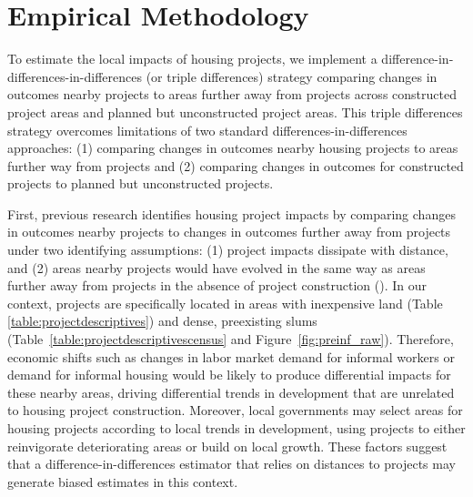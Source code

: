 \documentclass[12pt]{article}
\begin{document}
\section{Empirical Methodology}\label{section:methodology}


To estimate the local impacts of housing projects, we implement a difference-in-differences-in-differences (or triple differences) strategy comparing changes in outcomes nearby projects to areas further away from projects across constructed project areas and planned but unconstructed project areas.  This triple differences strategy overcomes limitations of two standard differences-in-differences approaches: (1) comparing changes in outcomes nearby housing projects to areas further way from projects and (2) comparing changes in outcomes for constructed projects to planned but unconstructed projects.

First, previous research identifies housing project impacts by comparing changes in outcomes nearby projects to changes in outcomes further away from projects under two identifying assumptions: (1) project impacts dissipate with distance, and (2) areas nearby projects would have evolved in the same way as areas further away from projects in the absence of project construction (\cite{diamond2016wants,harari2018slum}).  In our context, projects are specifically located in areas with inexpensive land (Table \ref{table:projectdescriptives}) and dense, preexisting slums (Table~\ref{table:projectdescriptivescensus} and Figure~\ref{fig:preinf_raw}).  Therefore, economic shifts such as changes in labor market demand for informal workers or demand for informal housing would be likely to produce differential impacts for these nearby areas, driving differential trends in development that are unrelated to housing project construction.  Moreover, local governments may select areas for housing projects according to local trends in development, using projects to either reinvigorate deteriorating areas or build on local growth.  These factors suggest that a difference-in-differences estimator that relies on distances to projects may generate biased estimates in this context.
\end{document}
